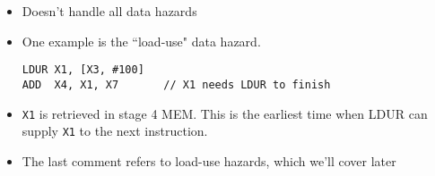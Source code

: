 \begin{frame}[fragile]
 
\begin{itemize}
  \item Doesn't handle all data hazards
  
\item One example is the ``load-use" data hazard.
  \begin{verbatim}
LDUR X1, [X3, #100]
ADD  X4, X1, X7       // X1 needs LDUR to finish
\end{verbatim}
\item \texttt{X1} is retrieved in stage 4 MEM. This is the earliest time when LDUR can supply \texttt{X1} to the next instruction.
  
\end{itemize}

\BNotes\ifnum{}

\begin{itemize}
  \item The last comment refers to load-use hazards, which we'll cover later
  \end{itemize}
\fi\ENotes
\end{frame}

